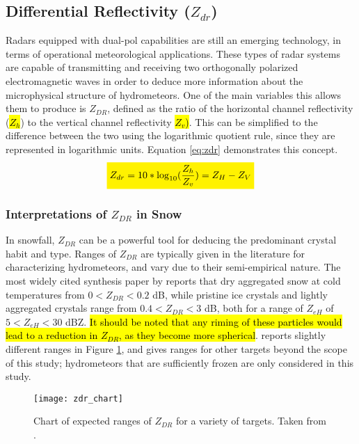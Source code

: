 \subsection{Differential Reflectivity ($Z_{dr}$)}
Radars equipped with dual-pol capabilities are still an emerging technology, in terms of operational meteorological applications. These
types of radar systems are capable of transmitting and receiving two orthogonally polarized electromagnetic waves in order to deduce more information about
the microphysical structure of hydrometeors. One of the main variables this allows them to produce is $Z_{DR}$, defined as the ratio of the horizontal
channel reflectivity (\hl{$Z_h$}) to the vertical channel reflectivity \hl{$Z_{v}$)}. This can be simplified to the difference between the two using the
logarithmic
quotient rule, since they are represented in logarithmic units. Equation \ref{eq:zdr} demonstrates this concept.
\begin{equation}\label{eq:zdr}
\mathcolorbox{yellow}{Z_{dr} = 10 * \log_{10}(\frac{Z_h}{Z_v}) = Z_H - Z_V}
\end{equation}
\subsubsection{Interpretations of $Z_{DR}$ in Snow}
In snowfall, $Z_{DR}$ can be a powerful tool for deducing the predominant crystal habit and type. Ranges of $Z_{DR}$ are typically given in the literature for characterizing hydrometeors, and vary due to their semi-empirical nature. The most widely cited synthesis paper by \citet{Straka2000} reports that dry aggregated snow at cold temperatures from $0 < Z_{DR} < 0.2$ dB, while pristine ice crystals and lightly aggregated crystals range from $0.4 < Z_{DR} < 3$ dB, both for a range of $Z_{eH}$ of $5 < Z_{eH} < 30$ dBZ. \hl{It should be noted that any riming of these particles would lead to a reduction in $Z_{DR}$, as they become more spherical}. \citet{Fabry2015} reports slightly different ranges in Figure \ref{zdr_chart}, and gives ranges for other targets beyond the scope of this study; hydrometeors that are sufficiently frozen are only considered in this study.
\begin{figure}[H]
\texttt{[image: zdr\_chart]}
\caption{Chart of expected ranges of $Z_{DR}$ for a variety of targets. Taken from \citet{Fabry2015}.} 
\label{zdr_chart}
\end{figure}

